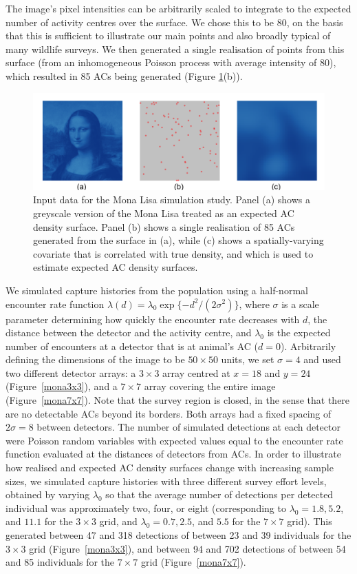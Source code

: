 \documentclass[useAMS,usenatbib,referee]{biom}
\begin{document}
The image's pixel intensities can be arbitrarily scaled to integrate to the expected number of activity centres over the surface. We chose this to be 80, on the basis that this is sufficient to illustrate our main points and also broadly typical of many wildlife surveys. We then generated a single realisation of points from this surface (from an inhomogeneous Poisson process with average intensity of 80), which resulted in 85 ACs being generated (Figure \ref{mlinputs}(b)).

\begin{figure}[htbp]
\centering
\includegraphics[width=1\textwidth]{mona_inputdata.png}
\caption{Input data for the Mona Lisa simulation study. Panel (a) shows a greyscale version of the Mona Lisa treated as an expected AC density surface. Panel (b) shows a single realisation of 85 ACs generated from the surface in (a), while (c) shows a spatially-varying covariate that is correlated with true density, and which is used to estimate expected AC density surfaces.}
\label{mlinputs}
\end{figure}

We simulated capture histories from the population using a half-normal encounter rate function $\lambda(d) = \lambda_0\exp\{-d^2/(2\sigma^2)\}$, where $\sigma$ is a scale parameter determining how quickly the encounter rate decreases with $d$, the distance between the detector and the activity centre, and $\lambda_0$ is the expected number of encounters at a detector that is at animal's AC ($d=0$). Arbitrarily defining the dimensions of the image to be $50\times 50$ units, we set $\sigma=4$ and used two different detector arrays: a $3\times3$ array centred at $x=18$ and $y=24$ (Figure~\ref{mona3x3}), and a $7\times 7$ array covering the entire image (Figure~\ref{mona7x7}). Note that the survey region is closed, in the sense that there are no detectable ACs beyond its borders. Both arrays had a fixed spacing of $2\sigma=8$ between detectors. The number of simulated detections at each detector were Poisson random variables with expected values equal to the encounter rate function evaluated at the distances of detectors from ACs. In order to illustrate how realised and expected AC density surfaces change with increasing sample sizes, we simulated capture histories with three different survey effort levels, obtained by varying $\lambda_0$ so that the average number of detections per detected individual was approximately two, four, or eight (corresponding to $\lambda_0=1.8, 5.2$, and $11.1$ for the $3\times 3$ grid, and $\lambda_0=0.7, 2.5$, and $5.5$ for the $7\times 7$ grid). This generated between 47 and 318 detections of between 23 and 39 individuals for the $3\times 3$ grid (Figure~\ref{mona3x3}), and between 94 and 702 detections of between 54 and 85 individuals for the $7\times 7$ grid (Figure~\ref{mona7x7}).
\end{document}
